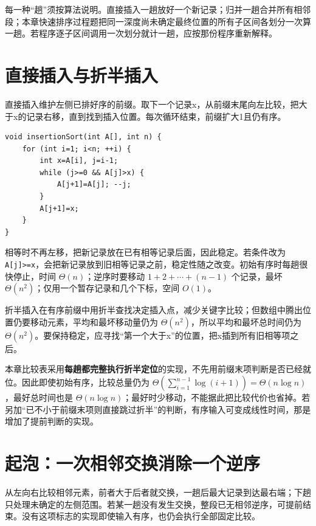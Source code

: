 每一种``趟''须按算法说明。直接插入一趟放好一个新记录；归并一趟合并所有相邻段；本章快速排序过程题把同一深度尚未确定最终位置的所有子区间各划分一次算一趟。若程序逐子区间调用一次划分就计一趟，应按那份程序重新解释。

\section{直接插入与折半插入}\label{ds-08-02}

直接插入维护左侧已排好序的前缀。取下一个记录x，从前缀末尾向左比较，把大于x的记录右移，直到找到插入位置。每次循环结束，前缀扩大1且仍有序。

\par\medskip\noindent
\begin{minipage}{\linewidth}
\begin{verbatim}
void insertionSort(int A[], int n) {
    for (int i=1; i<n; ++i) {
        int x=A[i], j=i-1;
        while (j>=0 && A[j]>x) {
            A[j+1]=A[j]; --j;
        }
        A[j+1]=x;
    }
}
\end{verbatim}
\end{minipage}\par\medskip

相等时不再左移，把新记录放在已有相等记录后面，因此稳定。若条件改为 \allowbreak{}\texttt{A{[}j{]}\textgreater{}=x}，会把新记录放到旧相等记录之前，稳定性随之改变。初始有序时每趟很快停止，时间 \(\Theta(n)\)；逆序时要移动 \(1+2+\cdots+(n-1)\) 个记录，最坏 \(\Theta(n^2)\)；仅用一个暂存记录和几个下标，空间 \(O(1)\)。

折半插入在有序前缀中用折半查找决定插入点，减少关键字比较；但数组中腾出位置仍要移动元素，平均和最坏移动量仍为 \(\Theta(n^2)\)，所以平均和最坏总时间仍为 \(\Theta(n^2)\)。要保持稳定，应寻找``第一个大于x''的位置，把x插到所有旧相等项之后。

本章比较表采用\textbf{每趟都完整执行折半定位}的实现，不先用前缀末项判断是否已经就位。因此即使初始有序，比较总量仍为 \(\Theta(\sum_{i=1}^{n-1}\log(i+1))=\Theta(n\log n)\)，最好总时间也是 \(\Theta(n\log n)\)；最好时少移动，不能据此把比较代价也省掉。若另加``已不小于前缀末项则直接跳过折半''的判断，有序输入可变成线性时间，那是增加了提前判断的实现。

\section{起泡：一次相邻交换消除一个逆序}\label{ds-08-03}

从左向右比较相邻元素，前者大于后者就交换，一趟后最大记录到达最右端；下趟只处理未确定的左侧范围。若某一趟没有发生交换，整段已无相邻逆序，可提前结束。没有这项标志的实现即使输入有序，也仍会执行全部固定比较。

